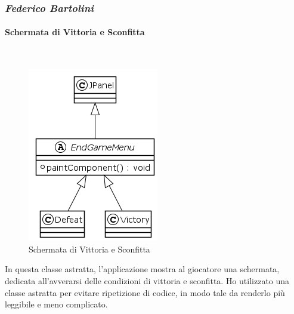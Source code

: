 \documentclass[a4paper,titlepage,12pt]{article}
\begin{document}
\subsubsection*{\large \slshape Federico Bartolini}
\paragraph{Schermata di Vittoria e Sconfitta}
\par \noindent \\
\begin{figure}[H]
    \centering
    \includegraphics[scale=0.7]{img/uml/EndGameMenu.png}
    \caption{Schermata di Vittoria e Sconfitta}
    \label{fig: Schermata di Vittoria e Sconfitta}
\end{figure}
\par \noindent In questa classe astratta, l’applicazione mostra al giocatore una schermata, dedicata all’avverarsi delle condizioni di vittoria e sconfitta. Ho utilizzato una classe astratta per evitare ripetizione di codice, in modo tale da renderlo più leggibile e meno complicato.
\end{document}
